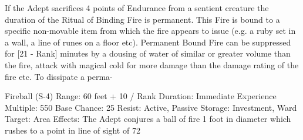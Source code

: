 \documentclass[a4paper]{article}
\begin{document}
\begin{multicols}{3}
If the Adept sacrifices 4 points of Endurance from
a sentient creature the duration of the Ritual of
Binding Fire is permanent. This Fire is bound to a
specific non-movable item from which the fire
appears to issue (e.g. a ruby set in a wall, a line of
runes on a floor etc). Permanent Bound Fire can be
suppressed for [21 - Rank] minutes by a dousing of
water of similar or greater volume than the fire,
attack with magical cold for more damage than the
damage rating of the fire etc. To dissipate a perma-

Fireball (S-4)
Range: 60 feet + 10 / Rank
Duration: Immediate
Experience Multiple: 550
Base Chance: 25%
Resist: Active, Passive
Storage: Investment, Ward
Target: Area
Effects: The Adept conjures a ball of fire 1 foot in
diameter which rushes to a point in line of sight of
72


\end{multicols}
\end{document}

